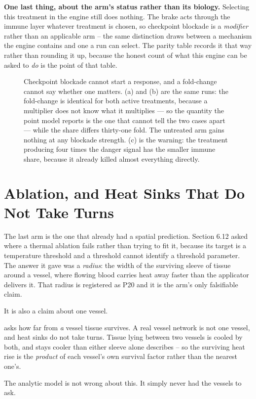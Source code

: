 \documentclass[11pt,twoside,openright]{report}
\begin{document}
\textbf{One last thing, about the arm's status rather than its biology.} Selecting this treatment in the engine still does nothing. The brake acts through the immune layer whatever treatment is chosen, so checkpoint blockade is a \textit{modifier} rather than an applicable arm -- the same distinction  draws between a mechanism the engine contains and one a run can select. The parity table records it that way rather than rounding it up, because the honest count of what this engine can be asked to \textit{do} is the point of that table.

\begin{figure}[tbp]
\setcounter{figure}{45}
\caption{Checkpoint blockade cannot start a response, and a fold-change cannot say whether one matters. (a) and (b) are the same runs: the fold-change is identical for both active treatments, because a multiplier does not know what it multiplies --- so the quantity the point model reports is the one that cannot tell the two cases apart --- while the share differs thirty-one fold. The untreated arm gains nothing at any blockade strength. (c) is the warning: the treatment producing four times the danger signal has the smaller immune share, because it already killed almost everything directly.}
\label{fig:fig50_checkpoint_priming}
\end{figure}

\section{Ablation, and Heat Sinks That Do Not Take Turns}

The last arm is the one that already had a spatial prediction. Section 6.12 asked where a thermal ablation fails rather than trying to fit it, because its target is a temperature threshold and a threshold cannot identify a threshold parameter. The answer it gave was a \textit{radius}: the width of the surviving sleeve of tissue around a vessel, where flowing blood carries heat away faster than the applicator delivers it. That radius is registered as P20 and it is the arm's only falsifiable claim.

It is also a claim about one vessel.

\begin{finding}
 asks how far from \textit{a} vessel tissue survives. A real vessel network is not one vessel, and heat sinks do not take turns. Tissue lying between two vessels is cooled by both, and stays cooler than either sleeve alone describes -- so the surviving heat rise is the \textit{product} of each vessel's own survival factor rather than the nearest one's.

The analytic model is not wrong about this. It simply never had the vessels to ask.
\end{finding}
\end{document}
